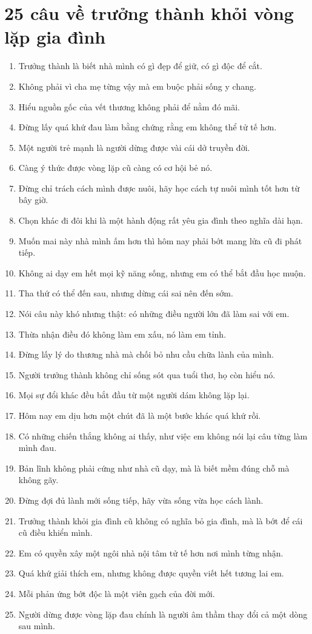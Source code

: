\section{25 câu về trưởng thành khỏi vòng lặp gia đình}
\begin{enumerate}[leftmargin=*,resume]
\item Trưởng thành là biết nhà mình có gì đẹp để giữ, có gì độc để cắt.
\item Không phải vì cha mẹ từng vậy mà em buộc phải sống y chang.
\item Hiểu nguồn gốc của vết thương không phải để nằm đó mãi.
\item Đừng lấy quá khứ đau làm bằng chứng rằng em không thể tử tế hơn.
\item Một người trẻ mạnh là người dừng được vài cái dở truyền đời.
\item Càng ý thức được vòng lặp cũ càng có cơ hội bẻ nó.
\item Đừng chỉ trách cách mình được nuôi, hãy học cách tự nuôi mình tốt hơn từ bây giờ.
\item Chọn khác đi đôi khi là một hành động rất yêu gia đình theo nghĩa dài hạn.
\item Muốn mai này nhà mình ấm hơn thì hôm nay phải bớt mang lửa cũ đi phát tiếp.
\item Không ai dạy em hết mọi kỹ năng sống, nhưng em có thể bắt đầu học muộn.
\item Tha thứ có thể đến sau, nhưng dừng cái sai nên đến sớm.
\item Nói câu này khó nhưng thật: có những điều người lớn đã làm sai với em.
\item Thừa nhận điều đó không làm em xấu, nó làm em tỉnh.
\item Đừng lấy lý do thương nhà mà chối bỏ nhu cầu chữa lành của mình.
\item Người trưởng thành không chỉ sống sót qua tuổi thơ, họ còn hiểu nó.
\item Mọi sự đổi khác đều bắt đầu từ một người dám không lặp lại.
\item Hôm nay em dịu hơn một chút đã là một bước khác quá khứ rồi.
\item Có những chiến thắng không ai thấy, như việc em không nói lại câu từng làm mình đau.
\item Bản lĩnh không phải cứng như nhà cũ dạy, mà là biết mềm đúng chỗ mà không gãy.
\item Đừng đợi đủ lành mới sống tiếp, hãy vừa sống vừa học cách lành.
\item Trưởng thành khỏi gia đình cũ không có nghĩa bỏ gia đình, mà là bớt để cái cũ điều khiển mình.
\item Em có quyền xây một ngôi nhà nội tâm tử tế hơn nơi mình từng nhận.
\item Quá khứ giải thích em, nhưng không được quyền viết hết tương lai em.
\item Mỗi phản ứng bớt độc là một viên gạch của đời mới.
\item Người dừng được vòng lặp đau chính là người âm thầm thay đổi cả một dòng sau mình.
\end{enumerate}


